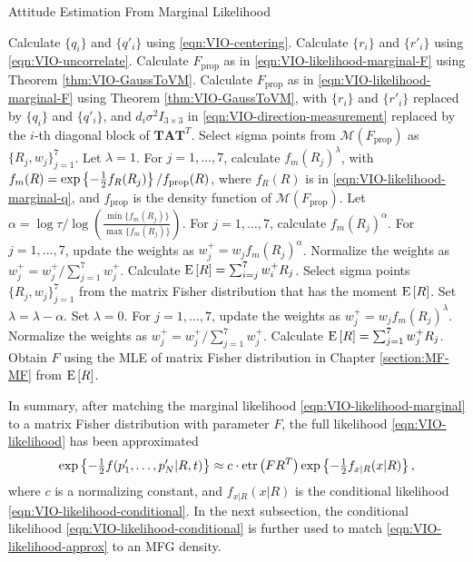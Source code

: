 \begin{table}
	\caption{Attitude Estimation From Marginal Likelihood}
	\label{tab:VIO-marginal}
	\begin{algorithmic}[1]
		\algrule[0.8pt]
		\algrule
		\State Calculate $\{q_i\}$ and $\{q'_i\}$ using \eqref{eqn:VIO-centering}.
		\State Calculate $\{r_i\}$ and $\{r'_i\}$ using \eqref{eqn:VIO-uncorrelate}.
		\State Calculate $F_\text{prop}$ as in \eqref{eqn:VIO-likelihood-marginal-F} using Theorem \ref{thm:VIO-GaussToVM}.
		\Else
		\State Calculate $F_\text{prop}$ as in \eqref{eqn:VIO-likelihood-marginal-F} using Theorem \ref{thm:VIO-GaussToVM}, with $\{r_i\}$ and $\{r'_i\}$ replaced by $\{q_i\}$ and $\{q'_i\}$, and $d_i\sigma^2I_{3\times 3}$ in \eqref{eqn:VIO-direction-measurement} replaced by the $i$-th diagonal block of $\mathbf{TAT}^T$.
		\EndIf
		\State Select sigma points \cite{gilitschenski2015unscented,lee2018bayesian} from $\mathcal{M}(F_\text{prop})$ as $\{R_j,w_j\}_{j=1}^7$.
		\State Let $\lambda = 1$.
		\State For $j=1,\ldots,7$, calculate $f_m(R_j)^\lambda$, with $f_m(R) = \exp\left\{ -\tfrac{1}{2}f_R(R_j) \right\} / f_\text{prop}(R)$, where $f_R(R)$ is in \eqref{eqn:VIO-likelihood-marginal-q}, and $f_\text{prop}$ is the density function of $\mathcal{M}(F_\text{prop})$.
		\State Let $\alpha = \log\tau / \log\left( \tfrac{\min\{f_m(R_j)\}}{\max\{f_m(R_j)\}} \right)$.
		\State For $j=1,\ldots,7$, calculate $f_m(R_j)^\alpha$.
		\State For $j=1,\ldots,7$, update the weights as $w_j^+ = w_j f_m(R_j)^\alpha$.
		\State Normalize the weights as $w_j^+ = w_j^+/\sum_{j=1}^7 w_j^+$.
		\State Calculate $\mathrm{E}\left[ R \right] = \sum_{i=j}^7 w_i^+ R_j$.
		\State Select sigma points $\{R_j,w_j\}_{j=1}^7$ from the matrix Fisher distribution that has the moment $\mathrm{E}\left[ R \right]$.
		\State Set $\lambda = \lambda-\alpha$.
		\Else
		\State Set $\lambda = 0$.
		\EndIf
		\EndWhile
		\State For $j=1,\ldots,7$, update the weights as $w_j^+ = w_j f_m(R_j)^\lambda$.
		\State Normalize the weights as $w_j^+ = w_j^+/\sum_{j=1}^7 w_j^+$.
		\State Calculate $\mathrm{E}\left[ R \right] = \sum_{j=1}^7 w_j^+ R_j$.
		\State Obtain $F$ using the MLE of matrix Fisher distribution in Chapter \ref{section:MF-MF} from $\mathrm{E}\left[ R \right]$.
		\EndProcedure
		\algrule[0.8pt]
	\end{algorithmic}
\end{table}

In summary, after matching the marginal likelihood \eqref{eqn:VIO-likelihood-marginal} to a matrix Fisher distribution with parameter $F$, the full likelihood \eqref{eqn:VIO-likelihood} has been approximated 
\begin{align} \label{eqn:VIO-likelihood-approx}
	\exp\left\{ -\tfrac{1}{2}f(p'_1,\ldots,p'_N|R,t) \right\} \approx c\cdot \mathrm{etr}\left( FR^T \right) \exp\left\{ -\tfrac{1}{2}f_{x|R}(x|R) \right\},
\end{align}
where $c$ is a normalizing constant, and $f_{x|R}(x|R)$ is the conditional likelihood \eqref{eqn:VIO-likelihood-conditional}.
In the next subsection, the conditional likelihood \eqref{eqn:VIO-likelihood-conditional} is further used to match \eqref{eqn:VIO-likelihood-approx} to an MFG density.

